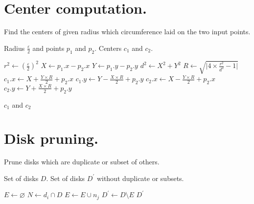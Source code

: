 \newpage 
\appendices

\section{Center computation.}
\begin{algorithm}[!ht]\label{app:centers}
    \caption{Find the centers of given radius which circumference laid on the two input points.}
    \begin{algorithmic}[1]
        \Require Radius $\frac{\varepsilon}{2}$ and points $p_1$ and $p_2$.
        \Ensure Centers $c_1$ and $c_2$.
        
        \State $r^2 \gets (\frac{\varepsilon}{2})^2$
        \State $X \gets p_1.x - p_2.x$
        \State $Y \gets p_1.y - p_2.y$
        \State $d^2 \gets X^2 + Y^2$
        \State $R \gets \sqrt{\lvert 4 \times \frac{r^2}{d^2} - 1 \rvert}$
        \State $c_1.x \gets X + \frac{Y \times R}{2} + p_2.x$
        \State $c_1.y \gets Y - \frac{X \times R}{2} + p_2.y$
        \State $c_2.x \gets X - \frac{Y \times R}{2} + p_2.x$
        \State $c_2.y \gets Y + \frac{X \times R}{2} + p_2.y$
        
        \State \Return $c_1$ and $c_2$
        \EndFunction
    \end{algorithmic}
\end{algorithm}

\section{Disk pruning.}
\begin{algorithm}\label{app:disks}
    \caption{Prune disks which are duplicate or subset of others.}
    \begin{algorithmic}[1]
        \Require Set of disks $D$.
        \Ensure Set of disks $D^{\prime}$ without duplicate or subsets.
        
        \State $E \gets \varnothing$
            \State $N \gets d_i \cap D$
                        \State $E \gets E \cup {n_j}$
                \EndIf
            \EndFor
        \EndFor        
        \State $D^{\prime} \gets D \setminus E$
        \State \Return $D^{\prime}$
        \EndFunction
    \end{algorithmic}
\end{algorithm}

